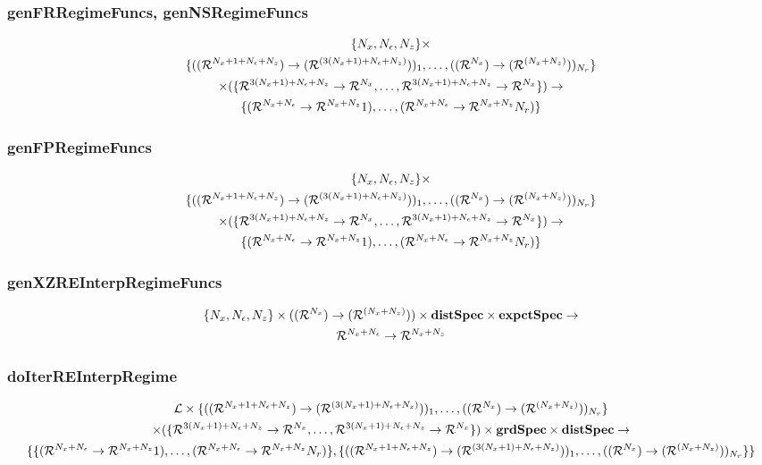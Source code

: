 \documentclass[tikz]{beamer}
\begin{document}
\begin{frame}
\frametitle{genFRRegimeFuncs, genNSRegimeFuncs}
\label{sec:genfrregimefunc}



{\small
\begin{gather*}
\{\numX,\numEps,\numZ\}\times\\
\{(\lilXRegimeFuncSig)_1,\ldots,(\xzFuncGuessSig)_{\numR}\}  \\
 \times (\eqnRegimeFuncSig )\rightarrow\\
\frfpnsRegimeFuncSig
\end{gather*}
}








\end{frame}




\begin{frame}
\frametitle{genFPRegimeFuncs}
\label{sec:genfpregimefunc}




{\small
\begin{gather*}
\{\numX,\numEps,\numZ\}\times\\
\{(\lilXRegimeFuncSig)_1,\ldots,(\xzFuncGuessSig)_{\numR}\}  \\
 \times (\eqnRegimeFuncSig )\rightarrow\\
\frfpnsRegimeFuncSig
\end{gather*}
}




\end{frame}

\begin{frame}
\frametitle{genXZREInterpRegimeFuncs}
\label{sec:genfpfunc}
\begin{gather*}
\{\numX,\numEps,\numZ\}\times(\xzFuncGuessSig)\times \dstSpec \times  \expctSpec   \rightarrow\\
\frfpnsFuncSig
\end{gather*}



\end{frame}


\begin{frame}
\frametitle{doIterREInterpRegime}
\label{sec:doiterreinterp}

\begin{gather*}
  \linMod \times 
\{(\lilXRegimeFuncSig)_1,\ldots,(\xzFuncGuessSig)_{\numR}\}  \\
 \times (\eqnRegimeFuncSig ) \times \grdSpec \times \dstSpec \rightarrow\\
\{\frfpnsRegimeFuncSig, \{(\lilXRegimeFuncSig)_1,\ldots,(\xzFuncGuessSig)_{\numR}\}\}
\end{gather*}



\end{frame}
\end{document}
